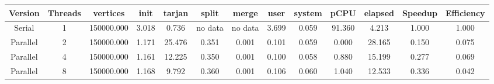\begin{tabular}{|c|c|c|c|c|c|c|c|c|c|c|c|c|}
\toprule
 Version &  Threads &   vertices &  init &  tarjan &   split &   merge &  user &  system &   pCPU &  elapsed &  Speedup &  Efficiency \\
\midrule
  Serial &        1 & 150000.000 & 3.018 &   0.736 & no data & no data & 3.699 &   0.059 & 91.360 &    4.213 &    1.000 &       1.000 \\
Parallel &        2 & 150000.000 & 1.171 &  25.476 &   0.351 &   0.001 & 0.101 &   0.059 &  0.000 &   28.165 &    0.150 &       0.075 \\
Parallel &        4 & 150000.000 & 1.161 &  12.225 &   0.350 &   0.001 & 0.100 &   0.058 &  0.880 &   15.199 &    0.277 &       0.069 \\
Parallel &        8 & 150000.000 & 1.168 &   9.792 &   0.360 &   0.001 & 0.106 &   0.060 &  1.040 &   12.533 &    0.336 &       0.042 \\
\bottomrule
\end{tabular}
